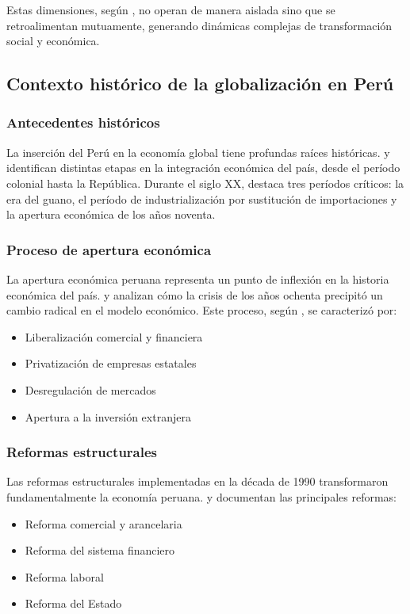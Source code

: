 \documentclass[12pt, a4paper]{article}
\begin{document}
Estas dimensiones, según \textcite{giddens2013}, no operan de manera aislada sino que se retroalimentan mutuamente, generando dinámicas complejas de transformación social y económica.

\subsection{Contexto histórico de la globalización en Perú}

\subsubsection{Antecedentes históricos}
La inserción del Perú en la economía global tiene profundas raíces históricas. \textcite{thorp2012} y \textcite{bulmer1998} identifican distintas etapas en la integración económica del país, desde el período colonial hasta la República. Durante el siglo XX, \textcite{sheahan2001} destaca tres períodos críticos: la era del guano, el período de industrialización por sustitución de importaciones y la apertura económica de los años noventa.

\subsubsection{Proceso de apertura económica}
La apertura económica peruana representa un punto de inflexión en la historia económica del país. \textcite{wise2003} y \textcite{pasco2009} analizan cómo la crisis de los años ochenta precipitó un cambio radical en el modelo económico. Este proceso, según \textcite{gonzales2015}, se caracterizó por:
\begin{itemize}
    \item Liberalización comercial y financiera
    \item Privatización de empresas estatales
    \item Desregulación de mercados
    \item Apertura a la inversión extranjera
\end{itemize}

\subsubsection{Reformas estructurales}
Las reformas estructurales implementadas en la década de 1990 transformaron fundamentalmente la economía peruana. \textcite{abusada2000} y \textcite{parodi2014} documentan las principales reformas:
\begin{itemize}
    \item Reforma comercial y arancelaria
    \item Reforma del sistema financiero
    \item Reforma laboral
    \item Reforma del Estado
\end{itemize}
\end{document}
